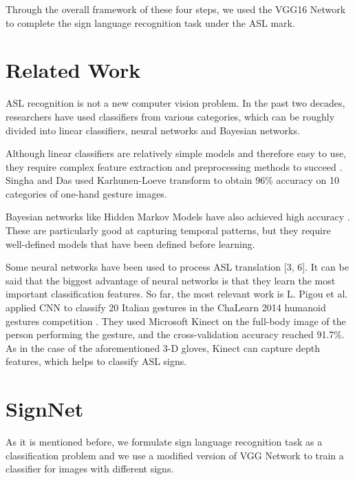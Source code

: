 \documentclass[10pt,twocolumn,letterpaper]{article}
\begin{document}
Through the overall framework of these four steps, we used the VGG16 Network to complete the sign language recognition task under the ASL mark.






\section{Related Work}

ASL recognition is not a new computer vision problem. In the past two decades, researchers have used classifiers from various categories, which can be roughly divided into linear classifiers, neural networks and Bayesian networks.

Although linear classifiers are relatively simple models and therefore easy to use, they require complex feature extraction and preprocessing methods to succeed \cite{singha2013hand} \cite{aryanie2015american}. Singha and Das used Karhunen-Loeve transform \cite{atwood2012american} to obtain 96\% accuracy on 10 categories of one-hand gesture images.

Bayesian networks like Hidden Markov Models have also achieved high accuracy \cite{starner1997real} \cite{jebali2013extension}. These are particularly good at capturing temporal patterns, but they require well-defined models that have been defined before learning.

Some neural networks have been used to process ASL translation [3, 6]. It can be said that the biggest advantage of neural networks is that they learn the most important classification features. So far, the most relevant work is L. Pigou et al. applied CNN to classify 20 Italian gestures in the ChaLearn 2014 humanoid gestures competition \cite{pigou2014sign}. They used Microsoft Kinect on the full-body image of the person performing the gesture, and the cross-validation accuracy reached 91.7\%. As in the case of the aforementioned 3-D gloves, Kinect can capture depth features, which helps to classify ASL signs.




\section{SignNet}

As it is mentioned before, we formulate sign language recognition task as a classification problem and we use a modified version of VGG Network \cite{simonyan2014very} to train a classifier for images with different signs. 
\end{document}
